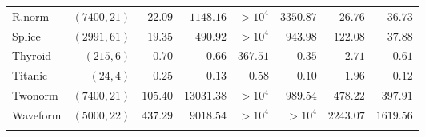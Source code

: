 \begin{tabular}{lrrrrrrr}
        \\ \addlinespace[0.5em]
    R.norm  & $(7400, 21)$ &          $22.09$ &        $1148.16$ &          $>10^4$ &        $3350.87$ &          $26.76$ &          $36.73$
        \\ \addlinespace[0.5em]
    Splice  & $(2991, 61)$ &          $19.35$ &         $490.92$ &          $>10^4$ &         $943.98$ &         $122.08$ &          $37.88$
        \\ \addlinespace[0.5em]
    Thyroid &   $(215, 6)$ &           $0.70$ &           $0.66$ &         $367.51$ &           $0.35$ &           $2.71$ &           $0.61$
        \\ \addlinespace[0.5em]
    Titanic &    $(24, 4)$ &           $0.25$ &           $0.13$ &           $0.58$ &           $0.10$ &           $1.96$ &           $0.12$
        \\ \addlinespace[0.5em]
    Twonorm & $(7400, 21)$ &         $105.40$ &       $13031.38$ &          $>10^4$ &         $989.54$ &         $478.22$ &         $397.91$
        \\ \addlinespace[0.5em]
    Waveform& $(5000, 22)$ &         $437.29$ &        $9018.54$ &          $>10^4$ &          $>10^4$ &        $2243.07$ &        $1619.56$
        \\ \addlinespace[0.5em]
    \bottomrule
\end{tabular}